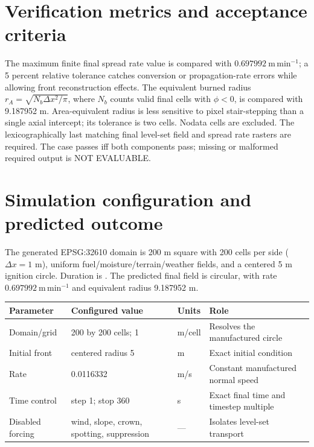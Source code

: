 \section{Verification metrics and acceptance criteria}

The maximum finite final spread rate value is compared with \(0.697992~\mathrm{m\,min^{-1}}\); a 5 percent relative tolerance catches conversion or propagation-rate errors while allowing front reconstruction effects. The equivalent burned radius
\(r_A=\sqrt{N_b\Delta x^2/\pi}\), where \(N_b\) counts valid final cells with \(\phi<0\), is compared with 9.187952 m. Area-equivalent radius is less sensitive to pixel stair-stepping than a single axial intercept; its tolerance is two cells. Nodata cells are excluded. The lexicographically last matching final level-set field and spread rate rasters are required. The case passes iff both components pass; missing or malformed required output is NOT EVALUABLE.

\section{Simulation configuration and predicted outcome}

The generated EPSG:32610 domain is 200 m square with 200 cells per side (\(\Delta x=1\) m), uniform fuel/moisture/terrain/weather fields, and a centered 5 m ignition circle. Duration is \FinalTime. The predicted final field is circular, with rate \(0.697992~\mathrm{m\,min^{-1}}\) and equivalent radius 9.187952 m.

\begin{center}\begin{tabular}{p{}p{}p{}p{}}\toprule
Parameter & Configured value & Units & Role \\
\midrule Domain/grid & 200 by 200 cells; 1 & m/cell & Resolves the manufactured circle \\
Initial front & centered radius 5 & m & Exact initial condition \\
Rate & 0.0116332 & m/s & Constant manufactured normal speed \\
Time control & step 1; stop 360 & s & Exact final time and timestep multiple \\
Disabled forcing & wind, slope, crown, spotting, suppression & --- & Isolates level-set transport \\
\bottomrule\end{tabular}\end{center}

